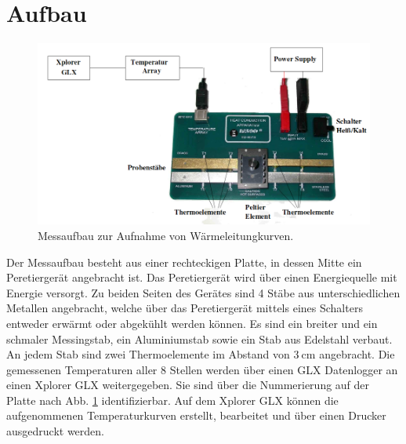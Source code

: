 \section{Aufbau}
\begin{figure}
	\centering
	\includegraphics[width=\linewidth-100pt,height=\textheight-100pt,keepaspectratio]{content/Bilder/aufbau204.png}
	\caption{ Messaufbau zur Aufnahme von Wärmeleitungkurven\cite{V204}.}
	\label{fig:Aufbau}
\end{figure}
Der Messaufbau besteht aus einer rechteckigen Platte, in dessen Mitte
 ein Peretiergerät angebracht ist. Das Peretiergerät wird über einen Energiequelle
  mit Energie versorgt. Zu beiden Seiten des Gerätes sind 4 Stäbe aus unterschiedlichen
  Metallen angebracht, welche über das Peretiergerät mittels eines Schalters entweder erwärmt oder abgekühlt
   werden können.
   Es sind ein breiter und ein schmaler Messingstab, ein
   Aluminiumstab sowie ein Stab aus Edelstahl verbaut. An jedem Stab sind zwei
   Thermoelemente im Abstand von $\SI{3}{\centi\meter}$ angebracht. Die gemessenen
   Temperaturen aller 8 Stellen werden über einen GLX Datenlogger an einen Xplorer GLX
   weitergegeben. Sie sind über die Nummerierung auf der Platte nach Abb.
    \ref{fig:Aufbau} identifizierbar. Auf dem Xplorer GLX können die aufgenommenen Temperaturkurven erstellt,
   bearbeitet und über einen Drucker ausgedruckt werden.
